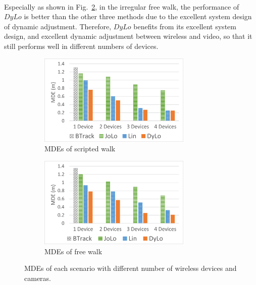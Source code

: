 \documentclass[a4paper,12pt]{report}
\begin{document}
\paragraph{}
Especially as shown in Fig.~\ref{figure:5_5_Number_of_Devices_MDE_FW}, in the irregular free walk, the performance of $DyLo$ is better than the other three methods due to the excellent system design of dynamic adjustment. Therefore, $DyLo$ benefits from its excellent system design, and excellent dynamic adjustment between wireless and video, so that it still performs well in different numbers of devices.
%

\begin{figure}[tbph]%
    \begin{subfigure}{1\linewidth}
    \centering
        \includegraphics[width=0.8\textwidth]{images/5_5_Number_of_Devices_MDE_SW.png}
        \caption{MDEs of scripted walk}
        \label{figure:5_5_Number_of_Devices_MDE_SW}
    \end{subfigure}
    \begin{subfigure}{1\linewidth}
    \centering
        \includegraphics[width=0.8\textwidth]{images/5_5_Number_of_Devices_MDE_FW.png}
        \caption{MDEs of free walk}
        \label{figure:5_5_Number_of_Devices_MDE_FW}
    \end{subfigure}
\caption{MDEs of each scenario with different number of wireless devices and cameras.}
\label{figure:5_5_Number_of_Devices_MDE}
\end{figure}
\end{document}
